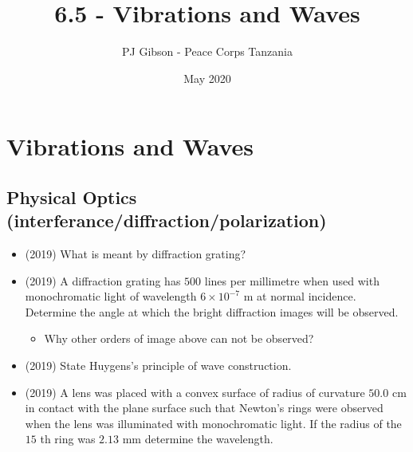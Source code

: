 \documentclass{article}
\title{6.5 - Vibrations and Waves}
\author{PJ Gibson - Peace Corps Tanzania}
\date{May 2020}
\begin{document}
\maketitle


\section{Vibrations and Waves}

\subsection{Physical Optics (interferance/diffraction/polarization)}
\begin{itemize}
\item (2019)  What is meant by diffraction grating?
\item (2019)  A diffraction grating has $ 500$ lines per millimetre when used with monochromatic light of wavelength $ 6 \times 10^{-7}$ m at normal incidence. Determine the angle at which the bright diffraction images will be observed. 
 \begin{itemize}
\item Why other orders of image above can not be observed? 
\end{itemize}
\item (2019)  State Huygens’s principle of wave construction.
\item (2019)  A lens was placed with a convex surface of radius of curvature $ 50.0$ cm in contact with the plane surface such that Newton’s rings were observed when the lens was illuminated with monochromatic light. If the radius of the $ 15$ th ring was $ 2.13$ mm determine the wavelength. 
\end{itemize}
\end{document}
